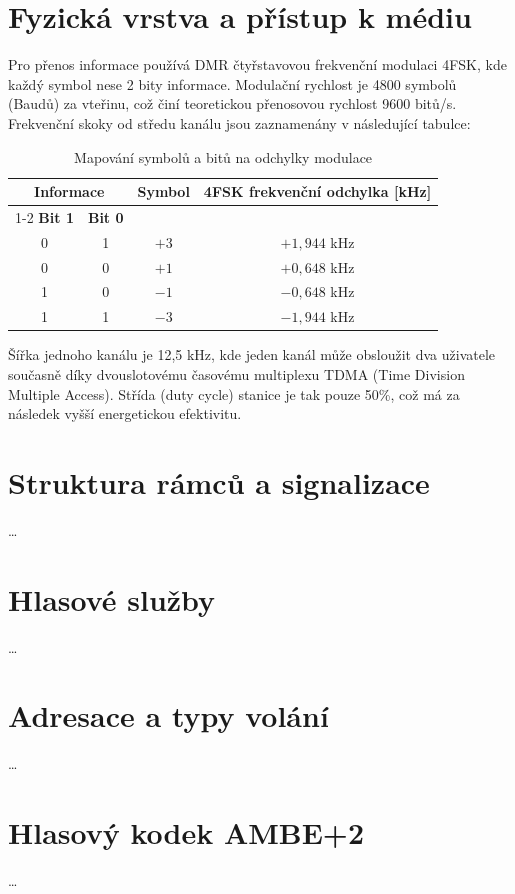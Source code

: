 \documentclass[twoside]{ctuthesis}
\begin{document}
\section{Fyzická vrstva a přístup k médiu}
Pro přenos informace používá DMR čtyřstavovou frekvenční modulaci 4FSK, kde každý symbol nese 2 bity informace. Modulační rychlost je 4800 symbolů (Baudů) za vteřinu,
což činí teoretickou přenosovou rychlost 9600 bitů/s. Frekvenční skoky od středu kanálu jsou zaznamenány v následující tabulce:

\begin{table}[htbp]
\shorthandoff{-}
\centering
\caption{Mapování symbolů a bitů na odchylky modulace}
\label{tab:dibit}
\begin{tabular}{|c|c|c|c|}
\hline
\multicolumn{2}{|c|}{\textbf{Informace}} & \multirow{2}{*}{\textbf{Symbol}} & \multirow{2}{*}{\textbf{4FSK frekvenční odchylka [kHz]}} \\
\cline{1-2}
\textbf{Bit 1} & \textbf{Bit 0} & & \\
\hline
0 & 1 & $+3$ & $+1{,}944$ kHz \\
\hline
0 & 0 & $+1$ & $+0{,}648$ kHz \\
\hline
1 & 0 & $-1$ & $-0{,}648$ kHz \\
\hline
1 & 1 & $-3$ & $-1{,}944$ kHz \\
\hline
\end{tabular}
\end{table}

Šířka jednoho kanálu je 12,5 kHz, kde jeden kanál může obsloužit dva uživatele současně díky dvouslotovému časovému multiplexu TDMA
(Time Division Multiple Access). Střída (duty cycle) stanice je tak pouze 50\%, což má za následek vyšší energetickou efektivitu.

\section{Struktura rámců a signalizace}
\ldots

\section{Hlasové služby}
\ldots

\section{Adresace a typy volání}
\ldots

\section{Hlasový kodek AMBE+2}
\ldots
\end{document}
